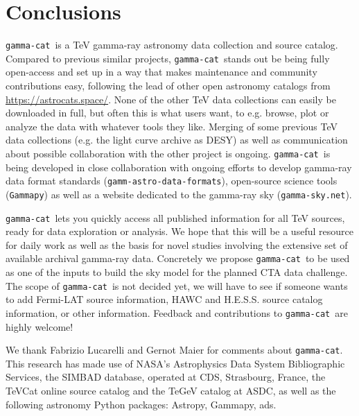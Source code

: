 \documentclass[11pt,twoside]{article}
\newcommand{\gammacat}{\texttt{gamma-cat}}
\newcommand{\gammapy}{\texttt{Gammapy}}
\newcommand{\gadf}{\texttt{gamm-astro-data-formats}}
\newcommand{\gammasky}{\texttt{gamma-sky.net}}
\newcommand{\tevcat}{\texttt{TeVCat}}
\newcommand{\tegev}{\texttt{TeGeV}}
\newcommand{\astrocats}{\url{https://astrocats.space/}}
\begin{document}
\section{Conclusions}
\label{sec:conclusions}




\gammacat\ is a TeV gamma-ray astronomy data collection and source catalog.
Compared to previous similar projects, \gammacat\ stands out be being fully
open-access and set up in a way that makes maintenance and community
contributions easy, following the lead of other open astronomy catalogs from
\astrocats. None of the other TeV data collections can easily be downloaded in
full, but often this is what users want, to e.g. browse, plot or analyze the
data with whatever tools they like. Merging of some previous TeV data
collections (e.g. the light curve archive as DESY) as well as communication
about possible collaboration with the other project is ongoing. \gammacat\ is
being developed in close collaboration with ongoing efforts to develop gamma-ray
data format standards (\gadf), open-source science tools (\gammapy) as well as a
website dedicated to the gamma-ray sky (\gammasky).

\gammacat\ lets you quickly access all published information for all TeV
sources, ready for data exploration or analysis. We hope that this will be a
useful resource for daily work as well as the basis for novel studies involving
the extensive set of available archival gamma-ray data. Concretely we propose
\gammacat\ to be used as one of the inputs to build the sky model for the
planned CTA data challenge. The scope of \gammacat\ is not decided yet, we will
have to see if someone wants to add Fermi-LAT source information, HAWC and
H.E.S.S. source catalog information, or other information. Feedback and
contributions to \gammacat\ are highly welcome!


\acknowledgements We thank Fabrizio Lucarelli and Gernot Maier for comments
about \gammacat. This research has made use of NASA's Astrophysics Data System
Bibliographic Services, the SIMBAD database, operated at CDS, Strasbourg,
France, the TeVCat online source catalog and the TeGeV catalog at ASDC, as well
as the following astronomy Python packages: Astropy, Gammapy, ads.


\end{document}
